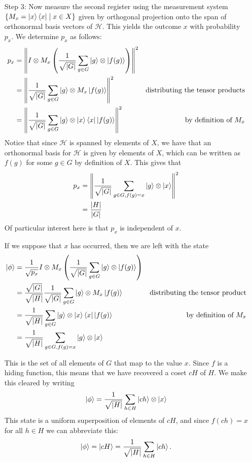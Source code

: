 \documentclass{beamer}
\renewcommand{\bra}{\Bra}
\renewcommand{\ket}{\Ket}
\renewcommand{\bra}{\Bra}
\renewcommand{\ket}{\Ket}
\newcommand{\abs}[1]{\left\lvert #1 \right\rvert}
\newcommand{\norm}[1]{\left\lVert #1 \right\rVert}
\renewcommand{\cal}[1]{\mathcal{#1}}
\begin{document}
\begin{frame}
\begin{enumerate}
        \item[Step 3:]
            Now measure the second register using the measurement system $\{M_x = \ket{x}\bra{x} \mid x \in X\}$ given by orthogonal projection onto the span of orthonormal basis vectors of $\cal{H}$.
            This yields the outcome $x$ with probability $p_x$.
            We determine $p_x$ as follows:
            \begin{align*}
            p_x &= \norm{I \otimes M_x \left(\frac{1}{\sqrt{\abs{G}}} \sum_{g \in G} \ket{g} \otimes \ket{f(g)}\right)}^2\\
            &= \norm{\frac{1}{\sqrt{\abs{G}}} \sum_{g \in G} \ket{g} \otimes M_x \ket{f(g)}}^2 & \text{distributing the tensor products}\\
            &= \norm{\frac{1}{\sqrt{\abs{G}}} \sum_{g \in G} \ket{g} \otimes \ket{x} \bra{x} \ket{f(g)}}^2 & \text{by definition of $M_x$}
            \end{align*}
            Notice that since $\cal{H}$ is spanned by elements of $X$, we have that an orthonormal basis for $\cal{H}$ is given by elements of $X$, which can be written as $f(g)$ for some $g \in G$ by definition of $X$.
            This gives that 
            \begin{align*}
            p_x &= \norm{\frac{1}{\sqrt{\abs{G}}} \sum_{g \in G, f(g) = x} \ket{g} \otimes \ket{x}}^2\\
            &= \frac{\abs{H}}{\abs{G}}
            \end{align*}
            Of particular interest here is that $p_x$ is independent of $x$.

            If we suppose that $x$ has occurred, then we are left with the state
            \begin{align*}
            \ket{\phi} &= \frac{1}{\sqrt{p_x}} I \otimes M_x \left(\frac{1}{\sqrt{\abs{G}}} \sum_{g \in G} \ket{g} \otimes \ket{f(g)}\right)\\
            &= \frac{\sqrt{\abs{G}}}{\sqrt{\abs{H}}} \frac{1}{\sqrt{\abs{G}}} \sum_{g \in G} \ket{g} \otimes M_x \ket{f(g)} & \text{distributing the tensor product}\\
            &= \frac{1}{\sqrt{\abs{H}}} \sum_{g \in G} \ket{g} \otimes \ket{x} \bra{x} \ket{f(g)} & \text{by definition of $M_x$}\\
            &= \frac{1}{\sqrt{\abs{H}}} \sum_{g \in G, f(g) = x} \ket{g} \otimes \ket{x}
            \end{align*}

            This is the set of all elements of $G$ that map to the value $x$.
            Since $f$ is a hiding function, this means that we have recovered a coset $cH$ of $H$.
            We make this cleared by writing
                $$\ket{\phi} = \frac{1}{\sqrt{\abs{H}}} \sum_{h \in H} \ket{ch} \otimes \ket{x}$$
            This state is a uniform superposition of elements of $cH$, and since $f(ch) = x$ for all $h \in H$ we can abbreviate this:
                $$ \ket{\phi} = \ket{cH} = \frac{1}{\sqrt{\abs{H}}} \sum_{h \in H} \ket{ch}.$$


\end{enumerate}
\end{frame}
\end{document}
